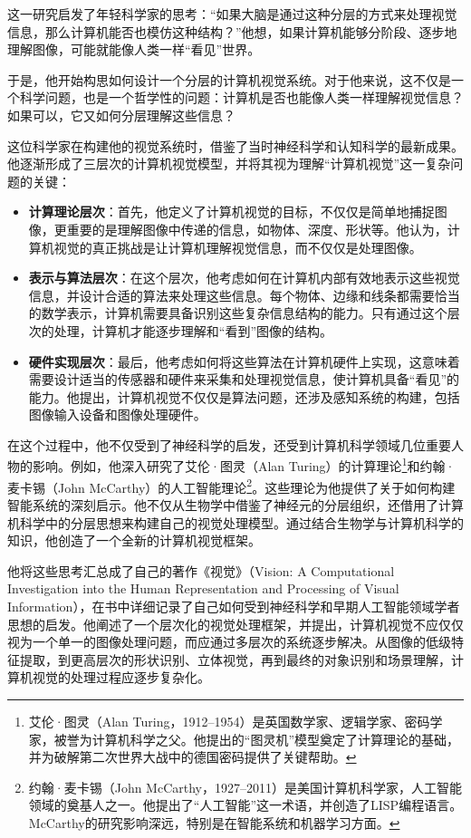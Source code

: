 这一研究启发了年轻科学家的思考：“如果大脑是通过这种分层的方式来处理视觉信息，那么计算机能否也模仿这种结构？”他想，如果计算机能够分阶段、逐步地理解图像，可能就能像人类一样“看见”世界。

于是，他开始构思如何设计一个分层的计算机视觉系统。对于他来说，这不仅是一个科学问题，也是一个哲学性的问题：计算机是否也能像人类一样理解视觉信息？如果可以，它又如何分层理解这些信息？

这位科学家在构建他的视觉系统时，借鉴了当时神经科学和认知科学的最新成果。他逐渐形成了三层次的计算机视觉模型，并将其视为理解“计算机视觉”这一复杂问题的关键：

\begin{itemize}
    \item \textbf{计算理论层次}：首先，他定义了计算机视觉的目标，不仅仅是简单地捕捉图像，更重要的是理解图像中传递的信息，如物体、深度、形状等。他认为，计算机视觉的真正挑战是让计算机理解视觉信息，而不仅仅是处理图像。
    
    \item \textbf{表示与算法层次}：在这个层次，他考虑如何在计算机内部有效地表示这些视觉信息，并设计合适的算法来处理这些信息。每个物体、边缘和线条都需要恰当的数学表示，计算机需要具备识别这些复杂信息结构的能力。只有通过这个层次的处理，计算机才能逐步理解和“看到”图像的结构。
    
    \item \textbf{硬件实现层次}：最后，他考虑如何将这些算法在计算机硬件上实现，这意味着需要设计适当的传感器和硬件来采集和处理视觉信息，使计算机具备“看见”的能力。他提出，计算机视觉不仅仅是算法问题，还涉及感知系统的构建，包括图像输入设备和图像处理硬件。
\end{itemize}

在这个过程中，他不仅受到了神经科学的启发，还受到计算机科学领域几位重要人物的影响。例如，他深入研究了艾伦·图灵（Alan Turing）的计算理论\footnote{艾伦·图灵（Alan Turing，1912--1954）是英国数学家、逻辑学家、密码学家，被誉为计算机科学之父。他提出的“图灵机”模型奠定了计算理论的基础，并为破解第二次世界大战中的德国密码提供了关键帮助。}和约翰·麦卡锡（John McCarthy）的人工智能理论\footnote{约翰·麦卡锡（John McCarthy，1927--2011）是美国计算机科学家，人工智能领域的奠基人之一。他提出了“人工智能”这一术语，并创造了LISP编程语言。McCarthy的研究影响深远，特别是在智能系统和机器学习方面。}。这些理论为他提供了关于如何构建智能系统的深刻启示。他不仅从生物学中借鉴了神经元的分层组织，还借用了计算机科学中的分层思想来构建自己的视觉处理模型。通过结合生物学与计算机科学的知识，他创造了一个全新的计算机视觉框架。

他将这些思考汇总成了自己的著作《视觉》（Vision: A Computational Investigation into the Human Representation and Processing of Visual Information），在书中详细记录了自己如何受到神经科学和早期人工智能领域学者思想的启发。他阐述了一个层次化的视觉处理框架，并提出，计算机视觉不应仅仅视为一个单一的图像处理问题，而应通过多层次的系统逐步解决。从图像的低级特征提取，到更高层次的形状识别、立体视觉，再到最终的对象识别和场景理解，计算机视觉的处理过程应逐步复杂化。

